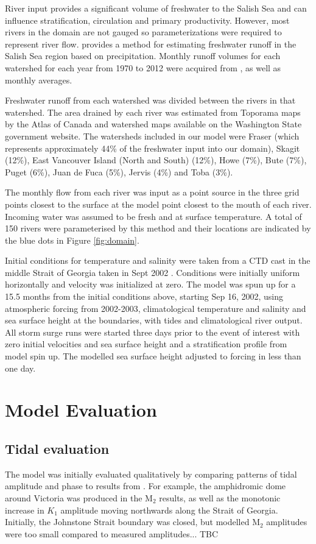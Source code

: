 \documentclass[pdftex,10pt]{article}
\begin{document}
River input provides a significant volume of freshwater to the Salish Sea and can influence stratification, circulation and primary productivity. However, most rivers in the domain are not gauged so parameterizations were required to represent river flow. \citet{morrison2011rivers} provides a method for estimating freshwater runoff in the Salish Sea region based on precipitation. Monthly runoff volumes for each watershed for each year from 1970 to 2012 were acquired from \citet{morrison2011rivers}, as well as monthly averages. 

Freshwater runoff from each watershed was divided between the rivers in that watershed. The area drained by each river was estimated from Toporama maps by the Atlas of Canada and watershed maps available on the Washington State government website. The watersheds included in our model were Fraser (which represents approximately 44\% of the freshwater input into our domain), Skagit (12\%), East Vancouver Island (North and South) (12\%), Howe (7\%), Bute (7\%), Puget (6\%), Juan de Fuca (5\%), Jervis (4\%) and Toba (3\%). 

The monthly flow from each river was input as a point source in the three grid points closest to the surface at the model point closest to the mouth of each river. Incoming water was assumed to be fresh and at surface temperature. A total of 150 rivers were parameterised by this method and their locations are indicated by the blue dots in Figure \ref{fig:domain}.

Initial conditions for temperature and salinity were taken from a CTD cast in the middle Strait of Georgia taken in Sept 2002 \citep{pawlowiczetal2007}.  Conditions were initially uniform horizontally and velocity was initialized at zero. The model was spun up for a 15.5 months from the initial conditions above, starting Sep 16, 2002, using atmospheric forcing from 2002-2003, climatological temperature and salinity and sea surface height at the boundaries, with tides and climatological river output.  All storm surge runs were started three days prior to the event of interest with zero initial velocities and sea surface height and a stratification profile from model spin up. The modelled sea surface height adjusted to forcing in less than one day. 

\section{Model Evaluation}\label{sec:model}

\subsection{Tidal evaluation}
The model was initially evaluated qualitatively by comparing patterns of tidal amplitude and phase to results from \citep{foreman1995tidal}. For example, the amphidromic dome around Victoria was produced in the M$_2$ results, as well as the monotonic increase in $K_1$ amplitude moving northwards along the Strait of Georgia. Initially, the Johnstone Strait boundary was closed, but modelled M$_2$ amplitudes were too small compared to measured amplitudes... TBC
\end{document}
